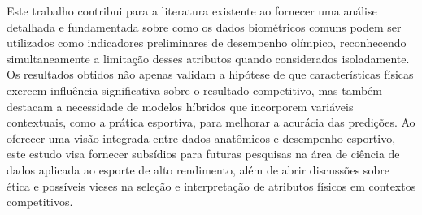 \documentclass{article}
\begin{document}
Este trabalho contribui para a literatura existente ao fornecer uma análise detalhada e fundamentada sobre como os dados biométricos comuns podem ser utilizados como indicadores preliminares de desempenho olímpico, reconhecendo simultaneamente a limitação desses atributos quando considerados isoladamente. Os resultados obtidos não apenas validam a hipótese de que características físicas exercem influência significativa sobre o resultado competitivo, mas também destacam a necessidade de modelos híbridos que incorporem variáveis contextuais, como a prática esportiva, para melhorar a acurácia das predições. Ao oferecer uma visão integrada entre dados anatômicos e desempenho esportivo, este estudo visa fornecer subsídios para futuras pesquisas na área de ciência de dados aplicada ao esporte de alto rendimento, além de abrir discussões sobre ética e possíveis vieses na seleção e interpretação de atributos físicos em contextos competitivos.
\end{document}

